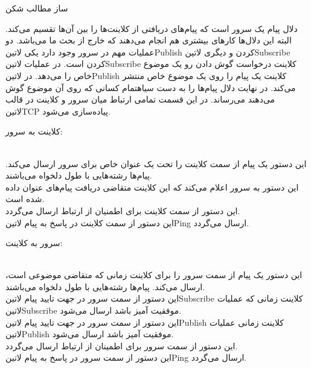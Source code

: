\documentclass[]{article}
\begin{document}
  ‌ساز
  ‌مطالب
  ‌شکن


  دلال پیام یک سرور است که پیام‌های دریافتی از کلاینت‌ها را بین آن‌ها تقسیم می‌کند. البته این دلال‌ها کارهای بیشتری هم انجام می‌دهند که خارج از بحث ما می‌باشد.
  دو عملیات مهم در سرور وجود دارد یکی ‌لاتین{Publish} کردن و دیگری ‌لاتین{Subscribe} کردن است. در عملیات ‌لاتین{Subscribe} کلاینت درخواست گوش دادن رو یک موضوع خاص را می‌دهد.
  در ‌لاتین{Publish} کلاینت یک پیام را روی یک موضوع خاص منتشر می‌کند. در نهایت دلال پیام‌ها را به دست ‌سیاه{تمام} کسانی که روی آن موضوع گوش می‌دهند می‌رساند.
  در این قسمت تمامی ارتباط میان سرور و کلاینت در قالب ‌لاتین{TCP} پیاده‌سازی می‌شود.


  کلاینت به سرور:

    \\ این دستور یک پیام از سمت کلاینت را تحت یک عنوان خاص برای سرور ارسال می‌کند. پیام‌ها رشته‌هایی با طول دلخواه می‌باشند.
    \\ این دستور به سرور اعلام می‌کند که این کلاینت متقاضی دریافت پیام‌های عنوان داده شده است.
    \\ این دستور از سمت کلاینت برای اطمنیان از ارتباط ارسال می‌گردد.
    \\ این دستور از سمت کلاینت در پاسخ به پیام ‌لاتین{Ping} ارسال می‌گردد.

  سرور به کلاینت:

    \\ این دستور یک پیام از سمت سرور را برای کلاینت زمانی که متقاضی موضوعی است، ارسال می‌کند. پیام‌ها رشته‌هایی با طول دلخواه می‌باشند.
    \\ این دستور از سمت سرور در جهت تایید پیام ‌لاتین{Subscribe} کلاینت زمانی که عملیات ‌لاتین{Subscribe} موفقیت آمیز باشد ارسال می‌شود.
    \\ این دستور از سمت سرور در جهت تایید پیام ‌لاتین{Publish} کلاینت زمانی عملیات ‌لاتین{Publish} موفقیت آمیز باشد ارسال می‌شود.
    \\ این دستور از سمت سرور برای اطمینان از ارتباط ارسال می‌گردد.
    \\ این دستور از سمت سرور در پاسخ به پیام ‌لاتین{Ping} ارسال می‌گردد.
\end{document}
